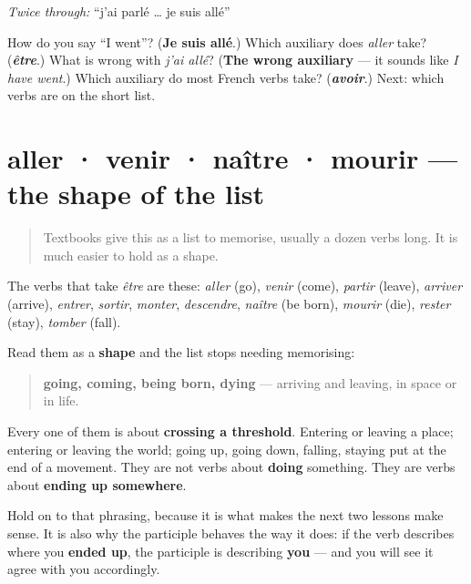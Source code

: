 \emph{Twice through:} \textquotedblleft{}j'ai parlé … je suis allé\textquotedblright{}

\begin{tcolorbox}[breakable,colback=teal!4,colframe=teal!35!black,title={Before you move on}]
How do you say \textquotedblleft{}I went\textquotedblright{}? (\textbf{Je suis allé}.) Which auxiliary does \emph{aller} take? (\emph{\textbf{être}}.) What is wrong with \emph{j'ai allé}? (\textbf{The wrong auxiliary} — it sounds like \emph{I have went}.) Which auxiliary do most French verbs take? (\emph{\textbf{avoir}}.) Next: which verbs are on the short list.
\end{tcolorbox}
\section[aller · venir · naître · mourir]{aller · venir · naître · mourir — the shape of the list}

\label{lesson:FR-C16-famille-etre}



\begin{quote}
Textbooks give this as a list to memorise, usually a dozen verbs long. It is much easier to hold as a shape.
\end{quote}

\begin{grammarlens}[title={Grammar Lens: arriving and leaving}]
The verbs that take \emph{être} are these: \emph{aller} (go), \emph{venir} (come), \emph{partir} (leave), \emph{arriver} (arrive), \emph{entrer}, \emph{sortir}, \emph{monter}, \emph{descendre}, \emph{naître} (be born), \emph{mourir} (die), \emph{rester} (stay), \emph{tomber} (fall).

Read them as a \textbf{shape} and the list stops needing memorising:

\begin{quote}
\textbf{going, coming, being born, dying} — arriving and leaving, in space or in life.
\end{quote}

Every one of them is about \textbf{crossing a threshold}. Entering or leaving a place; entering or leaving the world; going up, going down, falling, staying put at the end of a movement. They are not verbs about \textbf{doing} something. They are verbs about \textbf{ending up somewhere}.

Hold on to that phrasing, because it is what makes the next two lessons make sense. It is also why the participle behaves the way it does: if the verb describes where you \textbf{ended up}, the participle is describing \textbf{you} — and you will see it agree with you accordingly.
\end{grammarlens}

